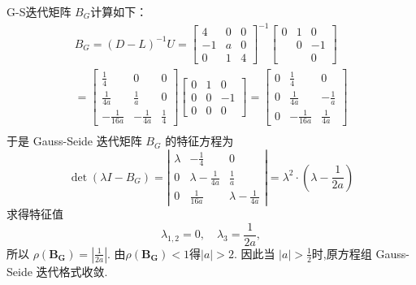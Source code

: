 \begin{tcolorbox}
G-S迭代矩阵 $ B_{G} $计算如下：
$$
\begin{array}{l}
B_{G}=(D-L)^{-1}U=\left[\begin{array}{ccc}
4 & 0& 0\\
-1& {a} &0 \\
0&1 &4
\end{array}\right]^{-1}\left[\begin{array}{ccc}
0 &1 & 0\\
 & 0 & -1\\
&  & 0
\end{array}\right] \\
=\left[\begin{array}{ccc}
\frac{1}{4} & 0 & 0 \\
\frac{1}{4a} & \frac{1}{a} &0 \\
-\frac{1}{16a} & -\frac{1}{4a} & \frac{1}{4}
\end{array}\right]\left[\begin{array}{ccc}
0 &1 & 0\\
 0& 0 & -1\\
0& 0 & 0
\end{array}\right] =\left[\begin{array}{ccc}
 0& \frac{1}{4} & 0 \\
0 & \frac{1}{4a} &-\frac{1}{a} \\
0 & -\frac{1}{16a} & \frac{1}{4a}
\end{array}\right] \\
\end{array}
$$
 于是 Gauss-Seide 迭代矩阵 $B_G$ 的特征方程为
$$
\operatorname{det}\left(\lambda I-B_{G}\right)=\left|\begin{array}{ccc}
\lambda& -\frac{1}{4} & 0 \\
0 & \lambda-\frac{1}{4a} &\frac{1}{a} \\
0 & \frac{1}{16a} & \lambda-\frac{1}{4a}
\end{array}\right|=\lambda^2 \cdot\left( \lambda-\frac{1}{2a}\right) 
$$
求得特征值
$$
\lambda_{1,2}=0, \quad \lambda_{3}= \frac{1}{2a},
$$
所以 $ \rho(\boldsymbol{B_G})=\left|\frac{1}{2a}\right| $. 由$\rho(\boldsymbol{B_G})<1$得$ |a|>2 $. 因此当 $ |a|>\frac 12 $时,原方程组 Gauss-Seide 迭代格式收敛.
\end{tcolorbox}


